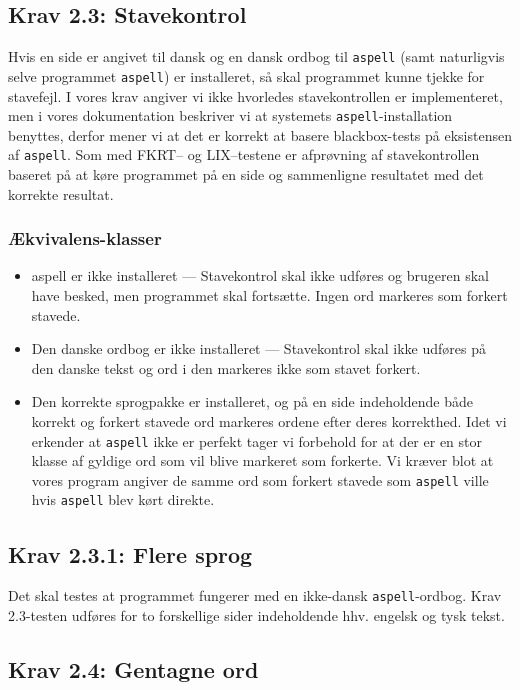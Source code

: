 \documentclass[a4paper,oneside,article]{memoir}
\begin{document}
\subsection{Krav 2.3: Stavekontrol}

Hvis en side er angivet til dansk og en dansk ordbog til
\texttt{aspell} (samt naturligvis selve programmet \texttt{aspell}) er
installeret, så skal programmet kunne tjekke for stavefejl. I vores
krav angiver vi ikke hvorledes stavekontrollen er implementeret, men i
vores dokumentation beskriver vi at systemets
\texttt{aspell}-installation benyttes, derfor mener vi at det er
korrekt at basere blackbox-tests på eksistensen af
\texttt{aspell}. Som med FKRT-- og LIX--testene er afprøvning af
stavekontrollen baseret på at køre programmet på en side og
sammenligne resultatet med det korrekte resultat.

\subsubsection{Ækvivalens-klasser}
\begin{itemize}
\item aspell er ikke installeret --- Stavekontrol skal ikke udføres og
  brugeren skal have besked, men programmet skal fortsætte. Ingen ord
  markeres som forkert stavede.
\item Den danske ordbog er ikke installeret --- Stavekontrol skal ikke
  udføres på den danske tekst og ord i den markeres ikke som stavet
  forkert.
\item Den korrekte sprogpakke er installeret, og på en side
  indeholdende både korrekt og forkert stavede ord markeres ordene
  efter deres korrekthed. Idet vi erkender at \texttt{aspell} ikke er
  perfekt tager vi forbehold for at der er en stor klasse af gyldige
  ord som vil blive markeret som forkerte. Vi kræver blot at vores
  program angiver de samme ord som forkert stavede som \texttt{aspell}
  ville hvis \texttt{aspell} blev kørt direkte.
\end{itemize}

\subsection{Krav 2.3.1: Flere sprog}

Det skal testes at programmet fungerer med en ikke-dansk
\texttt{aspell}-ordbog. Krav 2.3-testen udføres for to forskellige
sider indeholdende hhv. engelsk og tysk tekst.

\subsection{Krav 2.4: Gentagne ord}
\end{document}
